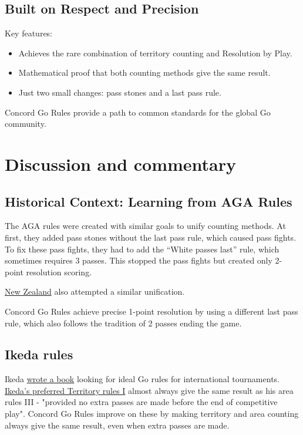 \documentclass[11pt]{article}
\begin{document}
\subsection*{Built on Respect and Precision}

Key features:

\begin{itemize}
\item Achieves the rare combination of territory counting and Resolution by Play.
\item Mathematical proof that both counting methods give the same result.
\item Just two small changes: pass stones and a last pass rule.
\end{itemize}

Concord Go Rules provide a path to common standards for the global Go community.

\newpage
\section*{Discussion and commentary}

\subsection*{Historical Context: Learning from AGA Rules}

The AGA rules were created with similar goals to unify counting methods.
At first, they added pass stones without the last pass rule, which caused pass fights.
To fix these pass fights, they had to add the ``White passes last'' rule, which sometimes requires 3 passes.
This stopped the pass fights but created only 2-point resolution scoring.

\href{https://go.org.nz/index.php/about-go/history-of-nz-rules-of-go}{New Zealand} also attempted a similar unification.

Concord Go Rules achieve precise 1-point resolution by using a different last pass rule, which also follows the tradition of 2 passes ending the game.

\subsection*{Ikeda rules}
Ikeda \href{https://gobase.org/studying/rules/ikeda/}{wrote a book} looking for ideal Go rules for international tournaments.
\href{https://gobase.org/studying/rules/ikeda/?sec=e_rules}{Ikeda's preferred Territory rules I} almost always give the same result as his area rules III
- "provided no extra passes are made before the end of competitive play".
Concord Go Rules improve on these by making territory and area counting always give the same result, even when extra passes are made.
\end{document}

